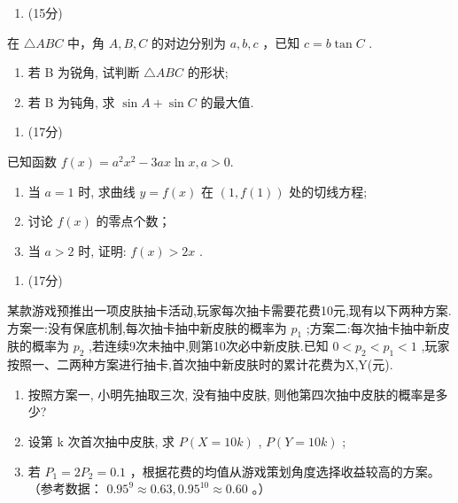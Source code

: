 \documentclass[UTF8,11pt,a4paper]{ctexart}
\providecommand{\tightlist}{%
  \setlength{\itemsep}{0pt}\setlength{\parskip}{0pt}}
\begin{document}
\begin{enumerate}
\def\labelenumi{\arabic{enumi}.}
\setcounter{enumi}{16}
\tightlist
\item
  (15分)
\end{enumerate}

在 \(\triangle ABC\) 中，角 \(A, B, C\) 的对边分别为 \(a, b, c\) ，已知 \(c = b\tan C\) .

\begin{enumerate}
\def\labelenumi{(\arabic{enumi})}
\item
  若 B 为锐角, 试判断 \(\triangle ABC\) 的形状;
\item
  若 B 为钝角, 求 \(\sin A + \sin C\) 的最大值.
\end{enumerate}

\begin{enumerate}
\def\labelenumi{\arabic{enumi}.}
\setcounter{enumi}{17}
\tightlist
\item
  (17分)
\end{enumerate}

已知函数 \(f(x)=a^{2}x^{2}-3ax\ln x,a>0.\)

\begin{enumerate}
\def\labelenumi{(\arabic{enumi})}
\item
  当 \(a = 1\) 时, 求曲线 \(y = f(x)\) 在 \((1, f(1))\) 处的切线方程;
\item
  讨论 \(f(x)\) 的零点个数；
\item
  当 \(a > 2\) 时, 证明: \(f(x) > 2x\) .
\end{enumerate}

\begin{enumerate}
\def\labelenumi{\arabic{enumi}.}
\setcounter{enumi}{18}
\tightlist
\item
  (17分)
\end{enumerate}

某款游戏预推出一项皮肤抽卡活动,玩家每次抽卡需要花费10元,现有以下两种方案.方案一:没有保底机制,每次抽卡抽中新皮肤的概率为 \(p_{1}\) ;方案二:每次抽卡抽中新皮肤的概率为 \(p_{2}\) ,若连续9次未抽中,则第10次必中新皮肤.已知 \(0<p_{2}<p_{1}<1\) ,玩家按照一、二两种方案进行抽卡,首次抽中新皮肤时的累计花费为X,Y(元).

\begin{enumerate}
\def\labelenumi{(\arabic{enumi})}
\item
  按照方案一, 小明先抽取三次, 没有抽中皮肤, 则他第四次抽中皮肤的概率是多少?
\item
  设第 k 次首次抽中皮肤, 求 \(P(X=10k)\) , \(P(Y=10k)\) ;
\item
  若 \(P_{1} = 2P_{2} = 0.1\) ，根据花费的均值从游戏策划角度选择收益较高的方案。（参考数据： \(0.95^{9} \approx 0.63, 0.95^{10} \approx 0.60\) 。）
\end{enumerate}
\end{document}
